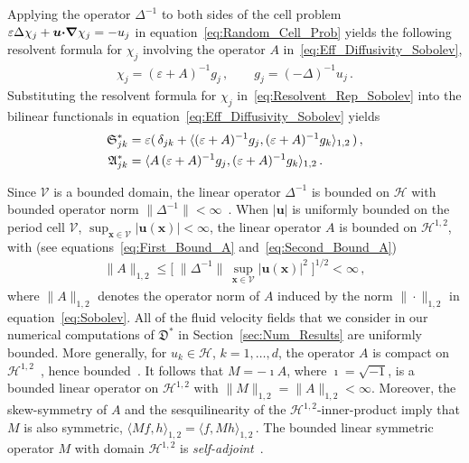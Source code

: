 \documentclass[english,12pt,jmp,graphicx]{revtex4-1}
\newcommand{\vecu}{\boldsymbol{u}}
\newcommand{\vecx}{\boldsymbol{x}}
\newcommand{\secref}[1]{Section~\ref{#1}}
\newcommand{\bnabla}{\mbox{\boldmath${\nabla}$}}
\newcommand{\bcdot}{\mbox{\boldmath${\cdot}$}}
\newcommand{\Vc}{\mathcal{V}}
\newcommand{\Sg}{\mathfrak{S}}
\newcommand{\Ag}{\mathfrak{A}}
\newcommand{\Dg}{\mathfrak{D}}
\newcommand{\Hs}{\mathscr{H}}
\begin{document}
Applying the operator $\Delta^{-1}$ to both sides of the cell problem 
$\varepsilon\Delta\chi_j+\vecu\bcdot\bnabla\chi_j=-u_j$ in
equation~\eqref{eq:Random_Cell_Prob} yields the following resolvent
formula for $\chi_j$ involving the operator $A$
in~\eqref{eq:Eff_Diffusivity_Sobolev},      
%
\begin{align}\label{eq:Resolvent_Rep_Sobolev}
  \chi_j=(\varepsilon+A)^{-1}g_j\,, \qquad 
  g_j=(-\Delta)^{-1}u_j\,.
\end{align}
%
Substituting the resolvent formula for $\chi_j$
in~\eqref{eq:Resolvent_Rep_Sobolev} into the bilinear functionals  in 
equation~\eqref{eq:Eff_Diffusivity_Sobolev} yields  
%
\begin{align}\label{eq:Eff_Diffusivity_Resolvent_Sobolev}
 \Sg^*_{jk}&=\varepsilon(\,\delta_{jk}+\langle(\varepsilon+A)^{-1}g_j,(\varepsilon+A)^{-1}g_k\rangle_{1,2}\,)\,, 
 \\
 \Ag^*_{jk}&=\langle A\,(\varepsilon+A)^{-1}g_j,(\varepsilon+A)^{-1}g_k\rangle_{1,2}\,.
 \notag
\end{align}
%




Since $\Vc$ is a bounded domain, the linear operator $\Delta^{-1}$ is
bounded on $\Hs$ with bounded operator norm
$\|\Delta^{-1}\|<\infty$~\cite{Stakgold:BVP:2000}. When $|\vecu|$ is
uniformly bounded on the period cell $\Vc$,
$\sup_{\vecx\in\Vc}|\vecu(\vecx)|<\infty$,
the linear operator $A$ is bounded on $\Hs^{1,2}$,
with (see equations~\eqref{eq:First_Bound_A} and~\eqref{eq:Second_Bound_A})
%
\begin{align}\label{eq:Bounded_A}
  \|A\|_{1,2}\leq\big[\;\|\Delta^{-1}\|\,\sup_{\vecx\in\Vc}|\vecu(\vecx)|^2\;\big]^{1/2}<\infty\,,
\end{align}
%
where $\|A\|_{1,2}$ denotes the operator norm of $A$ induced by the norm
$\|\cdot\|_{1,2}$ in equation~\eqref{eq:Sobolev}.
All of the fluid velocity fields that we consider in our numerical
computations of $\Dg^*$ in \secref{sec:Num_Results} are uniformly bounded. 
More generally, for $u_k\in\Hs$, $k=1,\ldots,d$, the operator $A$ is
compact on
$\Hs^{1,2}$~\cite{Bhattacharya:AAP:1999:951,Bhattacharya:1989:ASD,Pavliotis:PHD_Thesis},
hence bounded~\cite{Stakgold:BVP:2000}. It follows that $M=-\imath A$,
where $\imath=\sqrt{-1}$, is a
bounded linear operator on $\Hs^{1,2}$ with
$\|M\|_{1,2}=\|A\|_{1,2}<\infty$. Moreover, the skew-symmetry of $A$ and the
sesquilinearity of the $\Hs^{1,2}$-inner-product imply that $M$ is also
symmetric,
$\langle M f,h\rangle_{1,2}=\langle f,M h\rangle_{1,2}\,.$ The bounded linear symmetric operator $M$ with domain
$\Hs^{1,2}$ is \emph{self-adjoint}~\cite{Stone:64,Reed-1980}.
\end{document}
